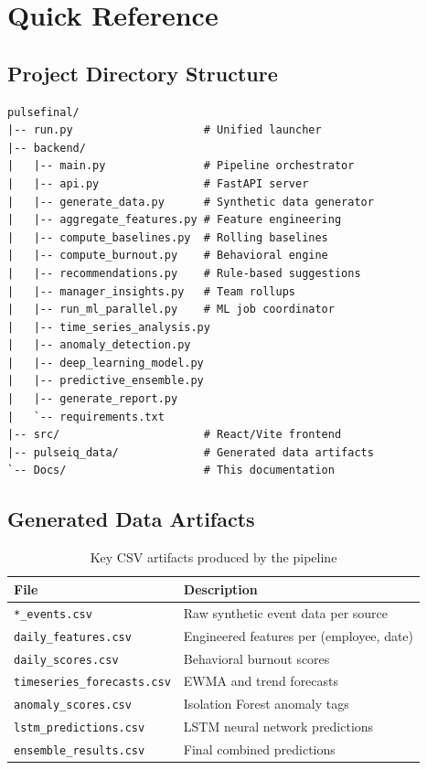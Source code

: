\documentclass[12pt, a4paper, oneside]{report}
\begin{document}
\appendix
\chapter{Quick Reference}
\label{app:quickref}

\section{Project Directory Structure}

\begin{lstlisting}[language={}, caption={Key project directories and files}]
pulsefinal/
|-- run.py                    # Unified launcher
|-- backend/
|   |-- main.py               # Pipeline orchestrator
|   |-- api.py                # FastAPI server
|   |-- generate_data.py      # Synthetic data generator
|   |-- aggregate_features.py # Feature engineering
|   |-- compute_baselines.py  # Rolling baselines
|   |-- compute_burnout.py    # Behavioral engine
|   |-- recommendations.py    # Rule-based suggestions
|   |-- manager_insights.py   # Team rollups
|   |-- run_ml_parallel.py    # ML job coordinator
|   |-- time_series_analysis.py
|   |-- anomaly_detection.py
|   |-- deep_learning_model.py
|   |-- predictive_ensemble.py
|   |-- generate_report.py
|   `-- requirements.txt
|-- src/                      # React/Vite frontend
|-- pulseiq_data/             # Generated data artifacts
`-- Docs/                     # This documentation
\end{lstlisting}

\section{Generated Data Artifacts}

\begin{table}[H]
\centering
\caption{Key CSV artifacts produced by the pipeline}
\begin{tabular}{@{} l p{8cm} @{}}
\toprule
\textbf{File} & \textbf{Description} \\
\midrule
\texttt{*\_events.csv}            & Raw synthetic event data per source \\
\texttt{daily\_features.csv}      & Engineered features per (employee, date) \\
\texttt{daily\_scores.csv}        & Behavioral burnout scores \\
\texttt{timeseries\_forecasts.csv}& EWMA and trend forecasts \\
\texttt{anomaly\_scores.csv}      & Isolation Forest anomaly tags \\
\texttt{lstm\_predictions.csv}    & LSTM neural network predictions \\
\texttt{ensemble\_results.csv}    & Final combined predictions \\
\bottomrule
\end{tabular}
\end{table}
\end{document}
